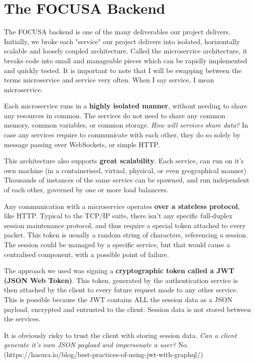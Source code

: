 \section{The FOCUSA Backend}

The FOCUSA backend is one of the many deliverables our project delivers.
Initially, we broke each "service" our project delivers into isolated, 
horizontally scalable and loosely coupled architecture. 
Called the microservice architecture, it breaks code into small and 
manageable pieces which can be rapidly implemented and quickly tested.
It is important to note that I will be swapping between the terms microservice 
and service very often. When I say service, I mean microservice.

Each microservice runs in a \textbf{highly isolated manner}, without needing to share
any resources in common. The services do not need to share any common memory, 
common variables, or common storage. \emph{How will services share data?} 
In case any services require to communicate with each other, they do so solely by 
message passing over WebSockets, or simple HTTP.

This architecture also supports \textbf{great scalability}. Each service, 
can run on it's own machine (in a containerised, virtual, physical, or 
even geographical manner) Thousands of instances of the same service can 
be spawned, and run independent of each other, governed by one or more load balancers.

Any communication with a microservice operates \textbf{over a stateless protocol}, 
like HTTP.
Typical to the TCP/IP suite, there isn't any specific full-duplex session maintenance 
protocol, and thus require a special token attached to every packet. This token is 
usually a random string of characters, referencing a session. The session could be 
managed by a specific service, but that would cause a centralised component, with a 
possible point of failure.

The approach we used was signing a \textbf{cryptographic token called a JWT (JSON Web Token)}. 
This token, generated by the authentication service is then attached by the client 
to every future request made to any other service. This is possible because the JWT contains 
ALL the session data as a JSON payload, encrypted and entrusted to the client. 
Session data is not stored between the services.

It is obviously risky to trust the client with storing session data. \emph{Can a client 
generate it's own JSON payload and impersonate a user?} No. (https://hasura.io/blog/best-practices-of-using-jwt-with-graphql/)

